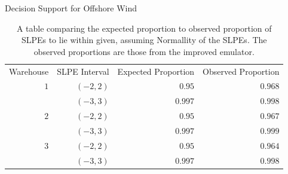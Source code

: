 \begin{chapter}{Decision Support for Offshore Wind \label{Ch:ds-for-ow}}
\begin{table}
  \centering
  \begin{tabular}{rrrr}
    \toprule
    Warehouse & SLPE Interval & Expected Proportion & Observed Proportion \\\cmidrule{1-4}
    $1$ & $(-2,2)$&$0.95$ & $0.968$\\
    &$(-3,3)$& $0.997$ &  $0.998$ \\\cmidrule{1-4}
    $2$ & $(-2,2)$&$0.95$ & $0.967$\\
    &$(-3,3)$& $0.997$ &  $0.999$ \\\cmidrule{1-4}
    $3$ &$(-2,2)$& $0.95$ & $0.964$\\
    &$(-3,3)$& $0.997$ &  $0.998$ \\\bottomrule
  \end{tabular}
  \caption{A table comparing the expected proportion to observed proportion of SLPEs to lie within given, assuming Normallity of the SLPEs. The observed proportions are those from the improved emulator.}
  \label{Tab:cred1}
\end{table}

\end{chapter}
